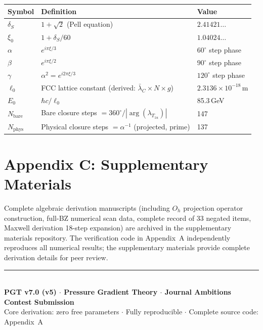 \documentclass[11pt,a4paper]{article}
\begin{document}
\begin{center}
\begin{tabular}{lll}
\toprule
Symbol & Definition & Value \\
\midrule
$\delta_S$ & $1+\sqrt{2}$ (Pell equation) & $2.41421\ldots$ \\
$\xi_0$ & $1+\delta_S/60$ & $1.04024\ldots$ \\
$\alpha$ & $e^{i\pi\xi/3}$ & $60^\circ$ step phase \\
$\beta$ & $e^{i\pi\xi/2}$ & $90^\circ$ step phase \\
$\gamma$ & $\alpha^2 = e^{i2\pi\xi/3}$ & $120^\circ$ step phase \\
$\ell_0$ & FCC lattice constant (derived: $\bar{\lambda}_C\times N\times g$) & $2.3136\times 10^{-18}$\,m \\
$E_0$ & $\hbar c/\ell_0$ & 85.3\,GeV \\
$N_{\mathrm{bare}}$ & Bare closure steps $= 360^\circ/|\arg(\lambda_{T_{1u}})|$ & 147 \\
$N_{\mathrm{phys}}$ & Physical closure steps $= \alpha^{-1}$ (projected, prime) & 137 \\
\bottomrule
\end{tabular}
\end{center}

\section{Appendix C: Supplementary Materials}\label{app:supp}

Complete algebraic derivation manuscripts (including $O_h$ projection operator construction, full-BZ numerical scan data, complete record of 33 negated items, Maxwell derivation 18-step expansion) are archived in the supplementary materials repository. The verification code in Appendix~A independently reproduces all numerical results; the supplementary materials provide complete derivation details for peer review.

\bigskip
\begin{center}
\rule{0.6\textwidth}{0.4pt}\\[6pt]
\textbf{PGT v7.0 (v5) $\cdot$ Pressure Gradient Theory $\cdot$ Journal Ambitions Contest Submission}\\
Core derivation: zero free parameters $\cdot$ Fully reproducible $\cdot$ Complete source code: Appendix~A
\end{center}
\end{document}
